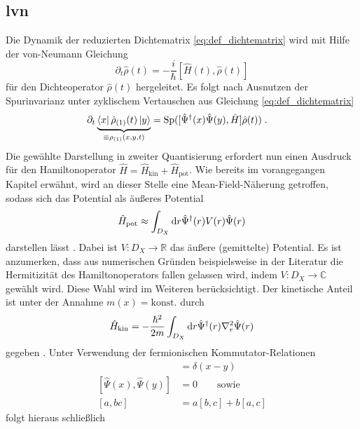 \subsection{\ac{lvn}}
Die Dynamik der reduzierten Dichtematrix \eqref{eq:def_dichtematrix} wird mit Hilfe der von-Neumann Gleichung
\begin{equation*}
    \partial_t \hat{\rho}(t) = - \frac{i}{\hbar}[\hat{H}(t), \hat{\rho}(t)]
\end{equation*}
für den Dichteoperator $\hat{\rho}(t)$ hergeleitet. Es folgt nach Ausnutzen der Spurinvarianz unter zyklischem Vertauschen aus Gleichung \eqref{eq:def_dichtematrix}
\begin{align*}
  \partial_t \underbrace{\bra{x}\hat{\rho}_{(1)}(t) \ket{y}}_{\equiv \rho_{(1)}(x,y,t)} &= \text{Sp}([\hat{\Psi}^{\dagger}(x)\hat{\Psi}(y),\hat{H}]\hat{\rho}(t)) \; .
\end{align*}
Die gewählte Darstellung in zweiter Quantisierung erfordert nun einen Ausdruck für den Hamiltonoperator ${\hat{H}=\hat{H}_{\text{kin}} + \hat{H}_{\text{pot}}}$. Wie bereits im vorangegangen Kapitel erwähnt, wird an dieser Stelle eine Mean-Field-Näherung getroffen, sodass sich das Potential als äußeres Potential
\begin{equation}
    \hat{H}_{\text{pot}} \approx \int_{D_X} \mathop{}\!\mathrm{d} r \hat{\Psi}^{\dagger}(r)V(r)\hat{\Psi}(r)
    \label{eq:Hpot}
\end{equation}
darstellen lässt \cite{modern}. Dabei ist ${V: D_X \rightarrow \mathbb{R}}$ das äußere (gemittelte) Potential. Es ist anzumerken, dass aus numerischen Gründen beispielsweise in der Literatur \cite{lukas1} die Hermitizität des Hamiltonoperators fallen gelassen wird, indem ${V: D_X \rightarrow \mathbb{C}}$ gewählt wird. Diese Wahl wird im Weiteren berücksichtigt. Der kinetische Anteil ist unter der Annahme ${m(x)=\text{konst.}}$ durch
\begin{equation*}
  \hat{H}_{\text{kin}} = -\frac{\hbar^2}{2m}\int_{D_X} \mathop{}\!\mathrm{d} r \hat{\Psi}^{\dagger}(r)\nabla_r^2\hat{\Psi}(r)
\end{equation*}
gegeben \cite{modern}. Unter Verwendung der fermionischen Kommutator-Relationen   \cite{modern}
\begin{align*}
  [\hat{\Psi}(x),\hat{\Psi}^{\dagger}(y)]&=\delta(x-y) \\
  [\hat{\Psi}(x),\hat{\Psi}(y)]&=0  \qquad \text{sowie}\\
  [a,bc]&=a[b,c]+b[a,c]
\end{align*}
folgt hieraus schließlich

